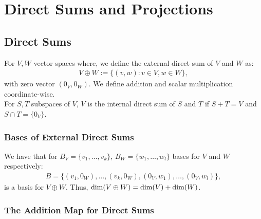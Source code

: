 \section{Direct Sums and Projections}

\subsection{Direct Sums}

For $V, W$ vector spaces where, we define the external direct sum of $V$ and
$W$ as: \begin{gather*}
    V \oplus W := \{(v, w) : v \in V, w \in W\},
\end{gather*} with zero vector $(0_V, 0_W)$. We define addition and scalar multiplication
coordinate-wise.
\\[\baselineskip]
For $S, T$ subspaces of $V$, $V$ is the internal direct sum of $S$ and $T$
if $S + T = V$ and $S \cap T = \{0_V\}$. 

\subsubsection{Bases of External Direct Sums}

We have that for $B_V = \{v_1, \ldots, v_k\}$, $B_W = \{w_1, \ldots, w_l\}$ 
bases for $V$ and $W$ respectively: \begin{gather*}
    B = \{(v_1, 0_W), \ldots, (v_k, 0_W), (0_V, w_1), \ldots, (0_V, w_l)\},
\end{gather*} is a basis for $V \oplus W$. Thus, $\operatorname{dim}(V \oplus W) = \operatorname{dim}(V) + \operatorname{dim}(W)$.

\subsubsection{The Addition Map for Direct Sums} \label{addmapdirect}

